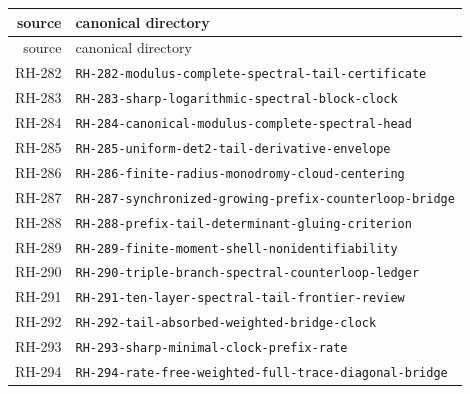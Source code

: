\begin{longtable}{r >{\raggedright\arraybackslash}p{}}
\toprule
source & canonical directory\\
\midrule
\endfirsthead
\toprule
source & canonical directory\\
\midrule
\endhead
RH-282 & \texttt{RH-\allowbreak{}282-\allowbreak{}modulus-\allowbreak{}complete-\allowbreak{}spectral-\allowbreak{}tail-\allowbreak{}certificate}\\
RH-283 & \texttt{RH-\allowbreak{}283-\allowbreak{}sharp-\allowbreak{}logarithmic-\allowbreak{}spectral-\allowbreak{}block-\allowbreak{}clock}\\
RH-284 & \texttt{RH-\allowbreak{}284-\allowbreak{}canonical-\allowbreak{}modulus-\allowbreak{}complete-\allowbreak{}spectral-\allowbreak{}head}\\
RH-285 & \texttt{RH-\allowbreak{}285-\allowbreak{}uniform-\allowbreak{}det2-\allowbreak{}tail-\allowbreak{}derivative-\allowbreak{}envelope}\\
RH-286 & \texttt{RH-\allowbreak{}286-\allowbreak{}finite-\allowbreak{}radius-\allowbreak{}monodromy-\allowbreak{}cloud-\allowbreak{}centering}\\
RH-287 & \texttt{RH-\allowbreak{}287-\allowbreak{}synchronized-\allowbreak{}growing-\allowbreak{}prefix-\allowbreak{}counterloop-\allowbreak{}bridge}\\
RH-288 & \texttt{RH-\allowbreak{}288-\allowbreak{}prefix-\allowbreak{}tail-\allowbreak{}determinant-\allowbreak{}gluing-\allowbreak{}criterion}\\
RH-289 & \texttt{RH-\allowbreak{}289-\allowbreak{}finite-\allowbreak{}moment-\allowbreak{}shell-\allowbreak{}nonidentifiability}\\
RH-290 & \texttt{RH-\allowbreak{}290-\allowbreak{}triple-\allowbreak{}branch-\allowbreak{}spectral-\allowbreak{}counterloop-\allowbreak{}ledger}\\
RH-291 & \texttt{RH-\allowbreak{}291-\allowbreak{}ten-\allowbreak{}layer-\allowbreak{}spectral-\allowbreak{}tail-\allowbreak{}frontier-\allowbreak{}review}\\
RH-292 & \texttt{RH-\allowbreak{}292-\allowbreak{}tail-\allowbreak{}absorbed-\allowbreak{}weighted-\allowbreak{}bridge-\allowbreak{}clock}\\
RH-293 & \texttt{RH-\allowbreak{}293-\allowbreak{}sharp-\allowbreak{}minimal-\allowbreak{}clock-\allowbreak{}prefix-\allowbreak{}rate}\\
RH-294 & \texttt{RH-\allowbreak{}294-\allowbreak{}rate-\allowbreak{}free-\allowbreak{}weighted-\allowbreak{}full-\allowbreak{}trace-\allowbreak{}diagonal-\allowbreak{}bridge}\\

\end{longtable}
